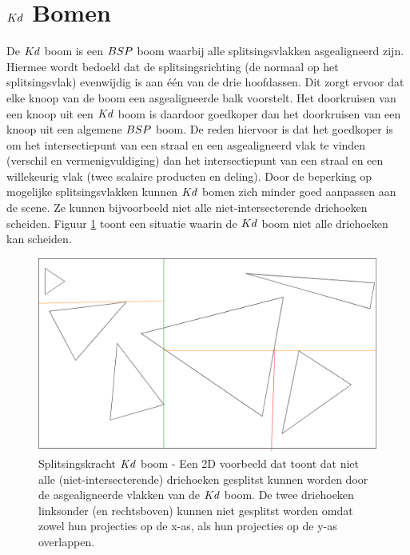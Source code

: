    
\section{$\symKd$ Bomen}   
    De $\symKd$ boom is een $BSP$ boom waarbij alle splitsingsvlakken asgealigneerd zijn.
    Hiermee wordt bedoeld dat de splitsingsrichting (de normaal op het splitsingsvlak) evenwijdig is aan één van de drie hoofdassen.
    Dit zorgt ervoor dat elke knoop van de boom een asgealigneerde balk voorstelt.
    Het doorkruisen van een knoop uit een $\symKd$ boom is daardoor goedkoper dan het doorkruisen van een knoop uit een algemene $BSP$ boom.
    De reden hiervoor is dat het goedkoper is om het intersectiepunt van een straal en een asgealigneerd vlak te vinden (verschil en vermenigvuldiging) dan het intersectiepunt van een straal en een willekeurig vlak (twee scalaire producten en deling).
    Door de beperking op mogelijke splitsingsvlakken kunnen $\symKd$ bomen zich minder goed aanpassen aan de scene.
    Ze kunnen bijvoorbeeld niet alle niet-intersecterende driehoeken scheiden. 
    Figuur \ref{fig:splitsing-kd} toont een situatie waarin de $\symKd$ boom niet alle driehoeken kan scheiden.
    \\

    \begin{figure}
        \centering
        \includegraphics[width=\linewidth]{img/splitsing-Kd}
        \caption[Splitsingskracht $\symKd$ boom]{Splitsingskracht $\symKd$ boom - \small Een 2D voorbeeld dat toont dat niet alle (niet-intersecterende) driehoeken gesplitst kunnen worden door de asgealigneerde vlakken van de $\symKd$ boom. De twee driehoeken linksonder (en rechtsboven) kunnen niet gesplitst worden omdat zowel hun projecties op de x-as, als hun projecties op de y-as overlappen.}
        \label{fig:splitsing-kd}    
    \end{figure}

